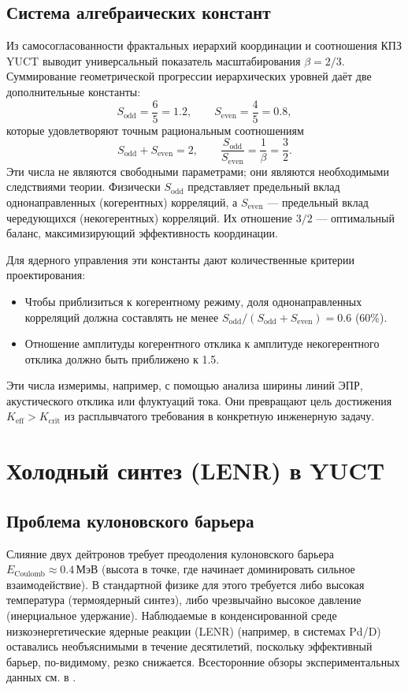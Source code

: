 \documentclass[12pt]{article}
\theoremstyle{remark}
\newcommand{\Keff}{K_{\mathrm{eff}}}
\newcommand{\Kcrit}{K_{\mathrm{crit}}}
\newcommand{\Sodd}{S_{\mathrm{odd}}}
\newcommand{\Seven}{S_{\mathrm{even}}}
\begin{document}
	\subsection{Система алгебраических констант}
	\label{sec:algebraic}
	
	Из самосогласованности фрактальных иерархий координации и соотношения КПЗ YUCT выводит универсальный показатель масштабирования \(\beta = 2/3\). Суммирование геометрической прогрессии иерархических уровней даёт две дополнительные константы:
	\[
	\Sodd = \frac{6}{5}=1.2,\qquad \Seven = \frac{4}{5}=0.8,
	\]
	которые удовлетворяют точным рациональным соотношениям
	\[
	\Sodd + \Seven = 2,\qquad \frac{\Sodd}{\Seven} = \frac{1}{\beta} = \frac{3}{2}.
	\]
	Эти числа не являются свободными параметрами; они являются необходимыми следствиями теории. Физически \(\Sodd\) представляет предельный вклад однонаправленных (когерентных) корреляций, а \(\Seven\) — предельный вклад чередующихся (некогерентных) корреляций. Их отношение \(3/2\) — оптимальный баланс, максимизирующий эффективность координации.
	
	Для ядерного управления эти константы дают количественные критерии проектирования:
	\begin{itemize}
		\item Чтобы приблизиться к когерентному режиму, доля однонаправленных корреляций должна составлять не менее \(\Sodd/(\Sodd+\Seven)=0.6\) (60\%).
		\item Отношение амплитуды когерентного отклика к амплитуде некогерентного отклика должно быть приближено к 1.5.
	\end{itemize}
	Эти числа измеримы, например, с помощью анализа ширины линий ЭПР, акустического отклика или флуктуаций тока. Они превращают цель достижения \(\Keff > \Kcrit\) из расплывчатого требования в конкретную инженерную задачу.
	
	\section{Холодный синтез (LENR) в YUCT}
	\label{sec:fusion}
	
	\subsection{Проблема кулоновского барьера}
	
	Слияние двух дейтронов требует преодоления кулоновского барьера \(E_{\text{Coulomb}} \approx 0.4\,\text{МэВ}\) (высота в точке, где начинает доминировать сильное взаимодействие). В стандартной физике для этого требуется либо высокая температура (термоядерный синтез), либо чрезвычайно высокое давление (инерциальное удержание). Наблюдаемые в конденсированной среде низкоэнергетические ядерные реакции (LENR) (например, в системах Pd/D) оставались необъяснимыми в течение десятилетий, поскольку эффективный барьер, по-видимому, резко снижается. Всесторонние обзоры экспериментальных данных см. в \cite{Storms2014, Nagel2019}.
	
\end{document}
